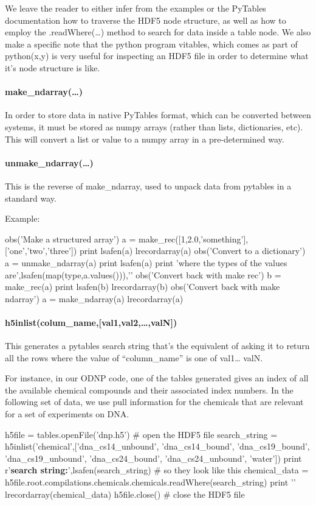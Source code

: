 We leave the reader to either infer from the examples or the
    PyTables documentation how to traverse the HDF5 node
    structure, as well as how to employ the .readWhere(\ldots)
    method to search for data inside a table node.
We also make a specific note that the python program vitables,
    which comes as part of python(x,y) is very useful for
    inspecting an HDF5 file in order to determine what it's node
    structure is like.
\paragraph{make\_ndarray(\ldots)}
In order to store data in native PyTables format,
    which can be converted between systems,
    it must be stored as numpy arrays (rather than lists,
    dictionaries, etc).
This will convert a list or value to a numpy array
    in a pre-determined way.
\paragraph{unmake\_ndarray(\ldots)}
This is the reverse of make\_ndarray,
    used to unpack data from pytables in a standard way.

Example:
\begin{python}
obs('Make a structured array\n')
a = make_rec([1,2.0,'something'],['one','two','three'])
print lsafen(a)
lrecordarray(a)
obs('Convert to a dictionary\n')
a = unmake_ndarray(a)
print lsafen(a)
print 'where the types of the values are',lsafen(map(type,a.values())),'\n\n'
obs('Convert back with make rec\n')
b = make_rec(a)
print lsafen(b)
lrecordarray(b)
obs('Convert back with make ndarray\n')
a = make_ndarray(a)
lrecordarray(a)
\end{python}
\paragraph{h5inlist(colum\_name,[val1,val2,\ldots,valN])}
This generates a pytables search string
    that's the equivalent of asking it to return all the rows
    where the value of ``column\_name'' is one of val1\ldots
    valN.

For instance,
    in our ODNP code,
    one of the tables generated gives an index of all the
    available chemical compounds and their associated index
    numbers.
In the following set of data, we use pull information for the
    chemicals that are
    relevant for a set of experiments on DNA.

\label{codelabel:h5inlist}
\begin{python}
h5file = tables.openFile('dnp.h5') # open the HDF5 file
search_string = h5inlist('chemical',['dna_cs14_unbound',
    'dna_cs14_bound',
    'dna_cs19_bound',
    'dna_cs19_unbound',
    'dna_cs24_bound',
    'dna_cs24_unbound',
    'water'])
print r'\textbf{search string:}',lsafen(search_string) # so they look like this
chemical_data = h5file.root.compilations.chemicals.chemicals.readWhere(search_string)
print '\n{}\n\n'
lrecordarray(chemical_data)
h5file.close() # close the HDF5 file
\end{python}

